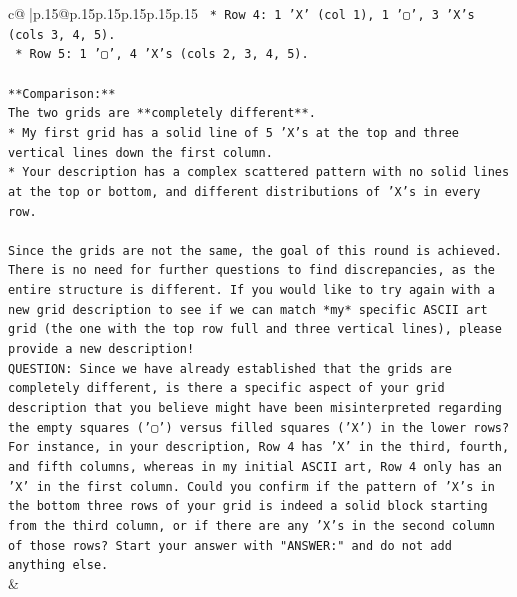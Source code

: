 \documentclass{article}
\begin{document}
{\begin{supertabular}{c@{$\;$}|p{.15\linewidth}@{}p{.15\linewidth}p{.15\linewidth}p{.15\linewidth}p{.15\linewidth}p{.15\linewidth}}
{{{\texttt{    *   Row 4: 1 'X' (col 1), 1 '▢', 3 'X's (cols 3, 4, 5).} \\
\texttt{    *   Row 5: 1 '▢', 4 'X's (cols 2, 3, 4, 5).} \\
\\ 
\texttt{**Comparison:**} \\
\texttt{The two grids are **completely different**.} \\
\texttt{*   My first grid has a solid line of 5 'X's at the top and three vertical lines down the first column.} \\
\texttt{*   Your description has a complex scattered pattern with no solid lines at the top or bottom, and different distributions of 'X's in every row.} \\
\\ 
\texttt{Since the grids are not the same, the goal of this round is achieved. There is no need for further questions to find discrepancies, as the entire structure is different. If you would like to try again with a new grid description to see if we can match *my* specific ASCII art grid (the one with the top row full and three vertical lines), please provide a new description!} \\
\texttt{QUESTION: Since we have already established that the grids are completely different, is there a specific aspect of your grid description that you believe might have been misinterpreted regarding the empty squares ('▢') versus filled squares ('X') in the lower rows? For instance, in your description, Row 4 has 'X' in the third, fourth, and fifth columns, whereas in my initial ASCII art, Row 4 only has an 'X' in the first column. Could you confirm if the pattern of 'X's in the bottom three rows of your grid is indeed a solid block starting from the third column, or if there are any 'X's in the second column of those rows? Start your answer with "ANSWER:" and do not add anything else.} \\
            }
        }
    }
    & \\ \\


\end{supertabular}}
\end{document}
